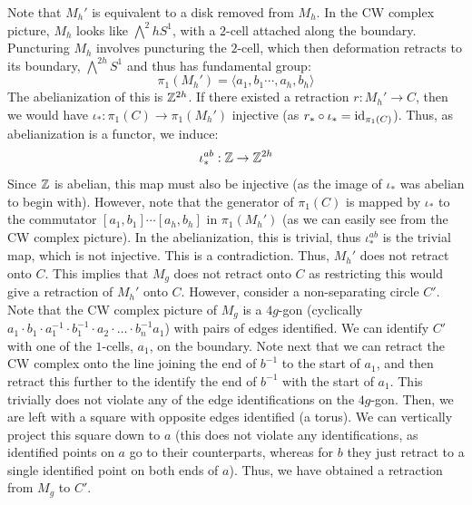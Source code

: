 \documentclass[12pt]{article}
\begin{document}
\begin{solution}
    Note that $M_h'$ is equivalent to a disk removed from $M_h$. In the CW complex picture, $M_h$ looks like $\bigwedge^2h S^1$, with a $2$-cell attached along the boundary. Puncturing $M_h$ involves puncturing the $2$-cell, which then deformation retracts to its boundary, $\bigwedge^{2h} S^1$ and thus has fundamental group: 
    \[ \pi_1(M_h') = \langle a_1, b_1\cdots, a_h, b_h \rangle \]
    The abelianization of this is $\mathbb Z^{2h}$. If there existed a retraction $r: M_h' \to C$, then we would have $\iota_*: \pi_1(C) \to \pi_1(M_h')$ injective (as $r_* \circ \iota_* = \operatorname{id}_{\pi_1(C)}$). Thus, as abelianization is a functor, we induce: 
    \[ \iota_*^{ab}: \mathbb Z \to \mathbb Z^{2h} \]
    Since $\mathbb Z$ is abelian, this map must also be injective (as the image of $\iota_*$ was abelian to begin with). However, note that the generator of $\pi_1(C)$ is mapped by $\iota_*$ to the commutator $[a_1, b_1]\cdots [a_h, b_h]$ in $\pi_1(M_h')$ (as we can easily see from the CW complex picture). In the abelianization, this is trivial, thus $\iota_*^{ab}$ is the trivial map, which is not injective. This is a contradiction. Thus, $M_h'$ does not retract onto $C$. This implies that $M_g$ does not retract onto $C$ as restricting this would give a retraction of $M_h'$ onto $C$. \bbni
    However, consider a non-separating circle $C'$. Note that the CW complex picture of $M_g$ is a $4g$-gon (cyclically $a_1 \cdot b_1 \cdot a_1^{-1} \cdot b_1^{-1} \cdot a_2 \cdot  \ldots \cdot b_n^{-1} a_1$) with pairs of edges identified. We can identify $C'$ with one of the $1$-cells, $a_1$, on the boundary. Note next that we can retract the CW complex onto the line joining the end of $b^{-1}$ to the start of $a_1$, and then retract this further to the identify the end of $b^{-1}$ with the start of $a_1$. This trivially does not violate any of the edge identifications on the $4g$-gon. Then, we are left with a square with opposite edges identified (a torus). We can vertically project this square down to $a$ (this does not violate any identifications, as identified points on $a$ go to their counterparts, whereas for $b$ they just retract to a single identified point on both ends of $a$). Thus, we have obtained a retraction from $M_g$ to $C'$.
\end{solution}
\newpage 
\end{document}
